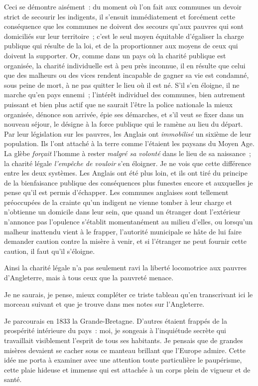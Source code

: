 \documentclass[french,twoside]{book} %
\begin{document}
\noindent Ceci se démontre aisément : du moment où l’on fait aux communes un devoir strict de secourir les indigents, il s’ensuit immédiatement et forcément cette conséquence que les communes ne doivent des secours qu’aux pauvres qui sont domiciliés sur leur territoire ; c’est le seul moyen équitable d’égaliser la charge publique qui résulte de la loi, et de la proportionner aux moyens de ceux qui doivent la supporter. Or, comme dans un pays où la charité publique est organisée, la charité individuelle est à peu près inconnue, il en résulte que celui que des malheurs ou des vices rendent incapable de gagner sa vie est condamné, sous peine de mort, à ne pas quitter le lieu où il est né. S'il s’en éloigne, il ne marche qu’en pays ennemi ; l’intérêt individuel des communes, bien autrement puissant et bien plus actif que ne saurait l’être la police nationale la mieux organisée, dénonce son arrivée, épie ses démarches, et s’il veut se fixer dans un nouveau séjour, le désigne à la force publique qui le ramène au lieu du départ. Par leur législation sur les pauvres, les Anglais ont \emph{immobilisé} un sixième de leur population. Ils l’ont attaché à la terre comme l’étaient les paysans du Moyen Age. La glèbe \emph{forçait} l’homme à rester \emph{malgré sa volonté} dans le lieu de sa naissance ; la charité légale \emph{l’empêche de vouloir} s’en éloigner. Je ne vois que cette différence entre les deux systèmes. Les Anglais ont été plus loin, et ils ont tiré du principe de la bienfaisance publique des conséquences plus funestes encore et auxquelles je pense qu’il est permis d’échapper. Les communes anglaises sont tellement préoccupées de la crainte qu’un indigent ne vienne tomber à leur charge et n’obtienne un domicile dans leur sein, que quand un étranger dont l’extérieur n’annonce pas l’opulence s’établit momentanément au milieu d’elles, ou lorsqu’un malheur inattendu vient à le frapper, l’autorité municipale se hâte de lui faire demander caution contre la misère à venir, et si l’étranger ne peut fournir cette caution, il faut qu’il s’éloigne.\par
Ainsi la charité légale n’a pas seulement ravi la liberté locomotrice aux pauvres d’Angleterre, mais à tous ceux que la pauvreté menace.\par
\bigbreak
\noindent Je ne saurais, je pense, mieux compléter ce triste tableau qu’en transcrivant ici le morceau suivant et que je trouve dans mes notes sur l’Angleterre.\par
Je parcourais en 1833 la Grande-Bretagne. D'autres étaient frappés de la prospérité intérieure du pays : moi, je songeais à l’inquiétude secrète qui travaillait visiblement l’esprit de tous ses habitants. Je pensais que de grandes misères devaient se cacher sous ce manteau brillant que l’Europe admire. Cette idée me porta à examiner avec une attention toute particulière le paupérisme, cette plaie hideuse et immense qui est attachée à un corps plein de vigueur et de santé.\par
\end{document}
